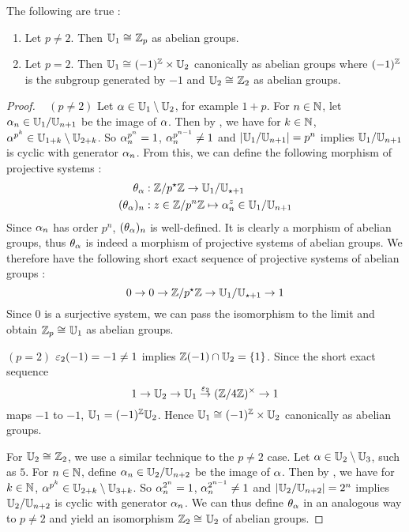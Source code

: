 \begin{prop}[Structure of $\U_1$]
  
  The following are true : 
  \begin{enumerate}
    \item Let $p \neq 2$. Then $\mathbb{U}_1 \cong_{} \mathbb{Z}_p$ as abelian groups. 
    \item Let $p = 2$. Then 
    $\mathbb{U}_1 \cong_{} (-1)^{\mathbb{Z}} \times \mathbb{U}_2$ canonically as abelian groups 
    where $(-1)^{\mathbb{Z}}$ is the subgroup generated by $-1$
    and $\mathbb{U}_2 \cong_{} \mathbb{Z}_2$ as abelian groups. 
  \end{enumerate}
\end{prop}
\begin{proof}~
  $(p \neq 2)$
  Let $\alpha \in \mathbb{U}_1\setminus\mathbb{U}_2$, for example $1 + p$. 
  For $n \in \mathbb{N}$, let $\alpha_n \in \mathbb{U}_1/\mathbb{U}_{n+1}$ be the image of $\alpha$. 
  Then by ,
  we have for $k \in \mathbb{N}$, $\alpha^{p^k} \in \mathbb{U}_{1 + k}\setminus\mathbb{U}_{2 + k}$. 
  So $\alpha_n^{p^{n}} = 1$, $\alpha_n^{p^{n-1}} \neq 1$ and 
  $\left\vert \mathbb{U}_1/\mathbb{U}_{n+1} \right\vert = p^n$ implies 
  $\mathbb{U}_1/\mathbb{U}_{n+1}$ is cyclic with generator $\alpha_n$. 
  From this, we can define the following morphism of projective systems : 
  \begin{align*}
    \theta_\alpha &: \mathbb{Z}/p^\star \mathbb{Z} \to \mathbb{U}_1/\mathbb{U}_{\star + 1} \\
    (\theta_\alpha)_n &: z \in \mathbb{Z}/p^n\mathbb{Z} \mapsto \alpha_n^{z} \in \mathbb{U}_1/\mathbb{U}_{n+1}
  \end{align*}
  Since $\alpha_n$ has order $p^n$, $(\theta_\alpha)_n$ is well-defined.
  It is clearly a morphism of abelian groups, 
  thus $\theta_\alpha$ is indeed 
  a morphism of projective systems of abelian groups.
  We therefore have the following short exact sequence of
  projective systems of abelian groups : 
  \[
    0 \to 0 \to \mathbb{Z}/p^\star\mathbb{Z} \to \mathbb{U}_1/\mathbb{U}_{\star+1} \to 1
  \]
  Since $0$ is a surjective system, 
  we can pass the isomorphism to the limit and obtain 
  $\mathbb{Z}_p \cong_{} \mathbb{U}_1$ as abelian groups. 

  $(p = 2)$
  $\varepsilon_2(-1) = -1 \neq 1$ implies $\mathbb{Z}(-1) \cap \mathbb{U}_2 = \left\{1\right\}$.
  Since the short exact sequence 
  \[
    1 \to \mathbb{U}_2 \to \mathbb{U}_1 \overset{\varepsilon_2}{\to} (\mathbb{Z}/4\mathbb{Z})^\times \to 1
  \]
  maps $-1$ to $-1$, $\mathbb{U}_1 = (-1)^{\mathbb{Z}} \mathbb{U}_2$.
  Hence $\mathbb{U}_1 \cong_{} (-1)^{\mathbb{Z}} \times \mathbb{U}_2$ canonically as abelian groups. 

  For $\mathbb{U}_2 \cong_{} \mathbb{Z}_2$, we use a similar technique to the $p \neq 2$ case. 
  Let $\alpha \in \mathbb{U}_2\setminus\mathbb{U}_3$, such as $5$. 
  For $n \in \mathbb{N}$, define $\alpha_n \in \mathbb{U}_2/\mathbb{U}_{n+2}$ be the image of $\alpha$. 
  Then by ,
  we have for $k \in \mathbb{N}$, $\alpha^{p^k} \in \mathbb{U}_{2 + k}\setminus\mathbb{U}_{3 + k}$. 
  So $\alpha_n^{2^{n}} = 1$, $\alpha_n^{2^{n-1}} \neq 1$ and 
  $\left\vert \mathbb{U}_2/\mathbb{U}_{n+2} \right\vert = 2^n$ implies $\mathbb{U}_2/\mathbb{U}_{n+2}$ is cyclic 
  with generator $\alpha_n$. 
  We can thus define $\theta_\alpha$ in an analogous way to $p\neq 2$
  and yield an isomorphism $\mathbb{Z}_2 \cong_{} \mathbb{U}_2$ of abelian groups. 
\end{proof}

